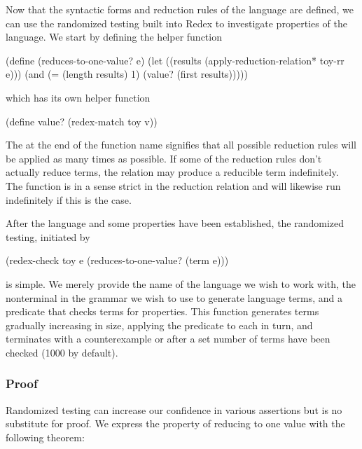 \documentclass[ms,electronic,twosidetoc,letterpaper,chaptercenter,parttop]{byumsphd}
\begin{document}
Now that the syntactic forms and reduction rules of the language are defined, we can use 
the randomized testing built into Redex to investigate properties of the language. We 
start by defining the helper function 
\begin{singlespace}
\begin{schemedisplay}
(define (reduces-to-one-value? e)
  (let ((results (apply-reduction-relation* toy-rr e)))
    (and (= (length results) 1)
         (value? (first results)))))
\end{schemedisplay}
\end{singlespace}
which has its own helper function 
\begin{singlespace}
\begin{schemedisplay}
(define value? (redex-match toy v))
\end{schemedisplay}
\end{singlespace}
The \scheme{*} at the end of the function name 
signifies that all possible reduction rules will be applied as many times as possible. If
some of the reduction rules don't actually reduce terms, the relation may produce a
reducible term indefinitely. The function  is in a sense
strict in the reduction relation and will likewise run indefinitely if this is the case.

After the language and some properties have been established, the randomized testing, 
initiated by
\begin{schemedisplay}
(redex-check toy e (reduces-to-one-value? (term e)))
\end{schemedisplay}
is simple. We merely provide the name of the language we wish to work with, the
nonterminal in the grammar we wish to use to generate language terms, and a predicate that
checks terms for properties. This function generates terms gradually increasing in size,
applying the predicate to each in turn, and terminates with a counterexample or after a
set number of terms have been checked (1000 by default).

\subsubsection{Proof}

Randomized testing can increase our confidence in various assertions but is no substitute 
for proof. We express the property of reducing to one value with the following theorem:
\end{document}
